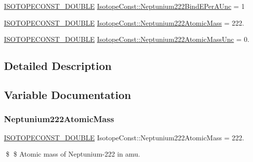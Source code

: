 \begin{DoxyCompactItemize}
\mbox{\hyperlink{group___isotope_const-_macros_ga8f45a7272ce02c0b4c65c44636ed719a}{I\+S\+O\+T\+O\+P\+E\+C\+O\+N\+S\+T\+\_\+\+D\+O\+U\+B\+LE}} \mbox{\hyperlink{group___isotope_const-_neptunium-_np222_gadfc532d2156185ed6cc3beb6911a20ee}{Isotope\+Const\+::\+Neptunium222\+Bind\+E\+Per\+A\+Unc}} = 1
\item 
\mbox{\hyperlink{group___isotope_const-_macros_ga8f45a7272ce02c0b4c65c44636ed719a}{I\+S\+O\+T\+O\+P\+E\+C\+O\+N\+S\+T\+\_\+\+D\+O\+U\+B\+LE}} \mbox{\hyperlink{group___isotope_const-_neptunium-_np222_gad3b0ab9323f671ce7db12ba3c716c8b6}{Isotope\+Const\+::\+Neptunium222\+Atomic\+Mass}} = 222.
\item 
\mbox{\hyperlink{group___isotope_const-_macros_ga8f45a7272ce02c0b4c65c44636ed719a}{I\+S\+O\+T\+O\+P\+E\+C\+O\+N\+S\+T\+\_\+\+D\+O\+U\+B\+LE}} \mbox{\hyperlink{group___isotope_const-_neptunium-_np222_ga3861925ad02550e64dc626c17e786802}{Isotope\+Const\+::\+Neptunium222\+Atomic\+Mass\+Unc}} = 0.
\end{DoxyCompactItemize}


\subsection{Detailed Description}


\subsection{Variable Documentation}
\mbox{\label{group___isotope_const-_neptunium-_np222_gad3b0ab9323f671ce7db12ba3c716c8b6}} 
\subsubsection{\texorpdfstring{Neptunium222\+Atomic\+Mass}{Neptunium222AtomicMass}}
{\footnotesize\ttfamily \mbox{\hyperlink{group___isotope_const-_macros_ga8f45a7272ce02c0b4c65c44636ed719a}{I\+S\+O\+T\+O\+P\+E\+C\+O\+N\+S\+T\+\_\+\+D\+O\+U\+B\+LE}} Isotope\+Const\+::\+Neptunium222\+Atomic\+Mass = 222.}

\$ \$ Atomic mass of Neptunium-\/222 in amu. \mbox{\label{group___isotope_const-_neptunium-_np222_ga3861925ad02550e64dc626c17e786802}} 
